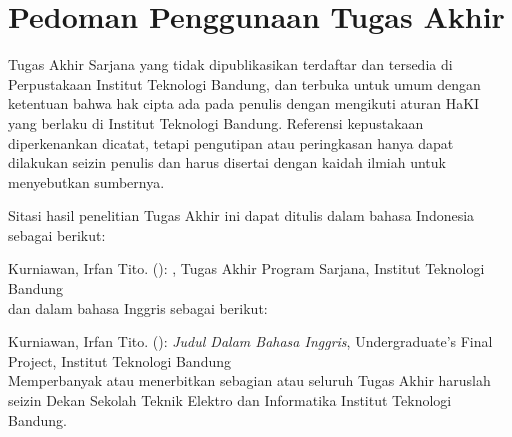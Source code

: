 \clearpage
\chapter*{Pedoman Penggunaan Tugas Akhir}

Tugas Akhir Sarjana yang tidak dipublikasikan terdaftar dan tersedia di Perpustakaan Institut Teknologi Bandung, dan terbuka untuk umum dengan ketentuan bahwa hak cipta ada pada penulis dengan mengikuti aturan HaKI yang berlaku di Institut Teknologi Bandung. Referensi kepustakaan diperkenankan dicatat, tetapi pengutipan atau peringkasan hanya dapat dilakukan seizin penulis dan harus disertai dengan kaidah ilmiah untuk menyebutkan sumbernya.

Sitasi hasil penelitian Tugas Akhir ini dapat ditulis dalam bahasa Indonesia sebagai berikut:

\hangindent=0.7cm Kurniawan, Irfan Tito. (\the\year): \textit{\thetitle}, Tugas Akhir Program Sarjana, Institut Teknologi Bandung\\

dan dalam bahasa Inggris sebagai berikut:

\hangindent=0.7cm Kurniawan, Irfan Tito. (\the\year): \textit{Judul Dalam Bahasa Inggris}, Undergraduate's Final Project, Institut Teknologi Bandung\\

Memperbanyak atau menerbitkan sebagian atau seluruh Tugas Akhir haruslah seizin Dekan Sekolah Teknik Elektro dan Informatika Institut Teknologi Bandung.

\clearpage